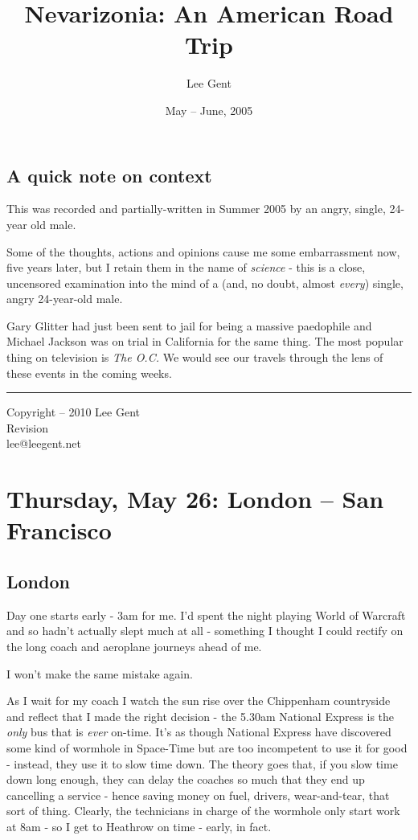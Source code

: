 \documentclass[a5paper,titlepage,11pt,draft]{book}
\title{Nevarizonia: An American Road Trip}
\author{Lee Gent}
\date{May -- June, 2005}
\newcommand{\svn}[1]{\svnsub#1}
\def\svnsub$#1${#1}
\begin{document}
\frontmatter
\maketitle

\section*{A quick note on context}
This was recorded and partially-written in Summer 2005 by an angry, single, 24-year old male.

Some of the thoughts, actions and opinions cause me some embarrassment now, five years later, but I retain them in the name of \emph{science} - this is a close, uncensored examination into the mind of a (and, no doubt, almost \emph{every}) single, angry 24-year-old male.

Gary Glitter had just been sent to jail for being a massive paedophile and Michael Jackson was on trial in California for the same thing.  The most popular thing on television is \emph{The O.C.}  We would see our travels through the lens of these events in the coming weeks.

\vfill
\hrule
\begin{center} {\scriptsize Copyright  -- 2010 Lee Gent \\ \svn{$Revision$} \\ lee@leegent.net }  \end{center}

\mainmatter
\chapter[London -- San Francisco]{Thursday, May 26: London -- San Francisco}
\section*{London}
Day one starts early - 3am for me.  I'd spent the night playing World of Warcraft and so hadn't actually slept much at all - something I thought I could rectify on the long coach and aeroplane journeys ahead of me.

I won't make the same mistake again.

As I wait for my coach I watch the sun rise over the Chippenham countryside and reflect that I made the right decision - the 5.30am National Express is the \emph{only} bus that is \emph{ever} on-time.  It's as though National Express have discovered some kind of wormhole in Space-Time but are too incompetent to use it for good - instead, they use it to slow time down.  The theory goes that, if you slow time down long enough, they can delay the coaches so much that they end up cancelling a service - hence saving money on fuel, drivers, wear-and-tear, that sort of thing.  Clearly, the technicians in charge of the wormhole only start work at 8am - so I get to Heathrow on time - early, in fact.
\end{document}
